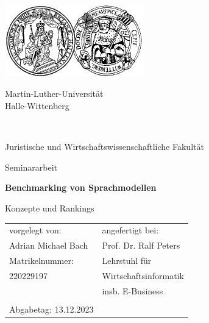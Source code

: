 \thispagestyle{empty} %
\begin{center}
\includegraphics[width=6cm]{Formalien/mlu_logo.jpg}
\vspace*{-1cm}
\begin{spacing}{1.75}
    \begin{huge}
        Martin-Luther-Universität\\
        Halle-Wittenberg
    \end{huge}\\
    \vspace*{-0.2cm}
    \begin{Large}
        Juristische und Wirtschaftswissenschaftliche Fakultät
    \end{Large}
\end{spacing}
\vspace*{2cm}
\begin{spacing}{0.95}
    \begin{Large}
        Seminararbeit\\
    \end{Large}
\end{spacing}
\vspace*{2cm}
\begin{LARGE}
    \textbf{Benchmarking von Sprachmodellen}\\
\end{LARGE}
\vspace*{0.3cm}
\begin{spacing}{1.6}
\begin{large}
    Konzepte und Rankings
\end{large}
\end{spacing}
\vspace*{2cm}
\begin{table}[htbp]
    \centering
    \begin{tabular}{p{9.25cm}p{4.68cm}}
        vorgelegt von:        & angefertigt bei:      \\
        Adrian Michael Bach   & Prof. Dr. Ralf Peters \\
        Matrikelnummer:       & Lehrstuhl für         \\
        220229197             & Wirtschaftsinformatik \\
                              & insb. E-Business      \\
                              &                       \\
        Abgabetag: 13.12.2023 &                       \\
    \end{tabular}
\end{table}
\end{center}
\newpage

